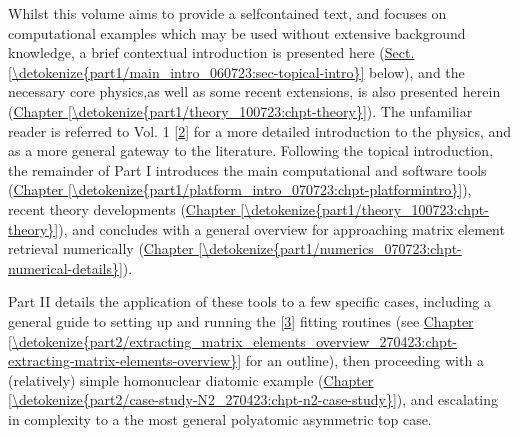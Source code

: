 \documentclass[letterpaper,table,10pt,english]{jupyterBook}
\begin{document}
\sphinxAtStartPar
Whilst this volume aims to provide a self\sphinxhyphen{}contained text, and focuses on computational examples which may be used without extensive background knowledge, a brief contextual introduction is presented here (\hyperref[\detokenize{part1/main_intro_060723:sec-topical-intro}]{Sect.\@ \ref{\detokenize{part1/main_intro_060723:sec-topical-intro}}} below), and the  necessary core physics,as well as some recent extensions, is also presented herein (\hyperref[\detokenize{part1/theory_100723:chpt-theory}]{Chapter \ref{\detokenize{part1/theory_100723:chpt-theory}}}). The unfamiliar reader is referred to  Vol. 1 {[}\hyperlink{cite.backmatter/bibliography:id663}{2}{]} for a more detailed introduction to the physics, and as a more general gateway to the literature. Following the topical introduction, the remainder of Part I introduces the main computational and software tools (\hyperref[\detokenize{part1/platform_intro_070723:chpt-platformintro}]{Chapter \ref{\detokenize{part1/platform_intro_070723:chpt-platformintro}}}), recent theory developments (\hyperref[\detokenize{part1/theory_100723:chpt-theory}]{Chapter \ref{\detokenize{part1/theory_100723:chpt-theory}}}), and concludes with a general overview for approaching matrix element retrieval numerically (\hyperref[\detokenize{part1/numerics_070723:chpt-numerical-details}]{Chapter \ref{\detokenize{part1/numerics_070723:chpt-numerical-details}}}).

\sphinxAtStartPar
Part II details the application of these tools to a few specific cases, including a general guide to setting up and running the  {[}\hyperlink{cite.backmatter/bibliography:id668}{3}{]} fitting routines (see \hyperref[\detokenize{part2/extracting_matrix_elements_overview_270423:chpt-extracting-matrix-elements-overview}]{Chapter \ref{\detokenize{part2/extracting_matrix_elements_overview_270423:chpt-extracting-matrix-elements-overview}}} for an outline), then proceeding with a (relatively) simple homonuclear diatomic example (\hyperref[\detokenize{part2/case-study-N2_270423:chpt-n2-case-study}]{Chapter \ref{\detokenize{part2/case-study-N2_270423:chpt-n2-case-study}}}), and escalating in complexity to a the most general polyatomic asymmetric top case.
\end{document}
